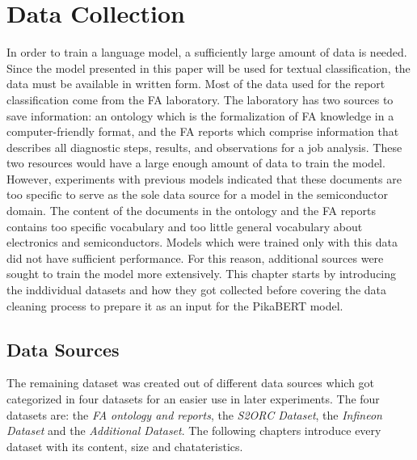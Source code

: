 \chapter{Data Collection} \label{chapter:datacollection}
In order to train a language model, a sufficiently large amount of data is needed. Since the model presented in this paper will be used for textual classification, the data must be available in written form.
Most of the data used for the report classification come from the FA laboratory. The laboratory has two sources to save information: an ontology which is the formalization of FA knowledge in a computer-friendly format, and the FA reports which comprise information that describes all diagnostic steps, results, and observations for a job analysis. These two resources would have a large enough amount of data to train the model. However, experiments with previous models indicated that these documents are too specific to serve as the sole data source for a model in the semiconductor domain. The content of the documents in the ontology and the FA reports contains too specific vocabulary and too little general vocabulary about electronics and semiconductors. Models which were trained only with this data did not have sufficient performance. For this reason, additional sources were sought to train the model more extensively.
This chapter starts by introducing the inddividual datasets and how they got collected before covering the data cleaning process to prepare it as an input for the PikaBERT model. 

\section{Data Sources}
The remaining dataset was created out of different data sources which got categorized in four datasets for an easier use in later experiments. The four datasets are: the \textit{FA ontology and reports}, the \textit{S2ORC Dataset}, the \textit{Infineon Dataset} and the \textit{Additional Dataset}. The following chapters introduce every dataset with its content, size and chatateristics.

